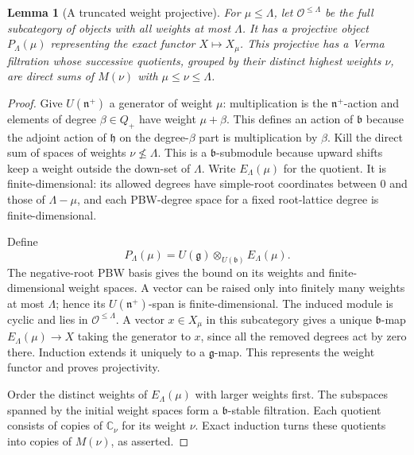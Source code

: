 \documentclass[11pt,oneside,openany]{book}
\newtheorem{lemma}[theorem]{Lemma}
\theoremstyle{definition}
\theoremstyle{remark}
\begin{document}
\begin{lemma}[A truncated weight projective]
\label{res:LO04}
For \(\mu\le\Lambda\), let \(\mathcal O^{\le\Lambda}\) be the
full subcategory of objects with all weights at most \(\Lambda\).
It has a projective object \(P_\Lambda(\mu)\) representing the
exact functor \(X\mapsto X_\mu\). This projective has a Verma
filtration whose successive quotients, grouped by their distinct
highest weights \(\nu\), are direct sums of \(M(\nu)\) with
\(\mu\le\nu\le\Lambda\).
\end{lemma}
\begin{proof}
Give \(U(\mathfrak n^+)\) a generator of weight \(\mu\): multiplication
is the \(\mathfrak n^+\)-action and elements of degree \(\beta\in Q_+\)
have weight \(\mu+\beta\). This defines an action of
\(\mathfrak b\) because the adjoint action of \(\mathfrak h\) on
the degree-\(\beta\) part is multiplication by \(\beta\).
Kill the direct sum of spaces of weights \(\nu\not\le\Lambda\).
This is a \(\mathfrak b\)-submodule because upward shifts keep a
weight outside the down-set of \(\Lambda\). Write \(E_\Lambda(\mu)\)
for the quotient. It is finite-dimensional: its allowed degrees
have simple-root coordinates between \(0\) and those of
\(\Lambda-\mu\), and each PBW-degree space for a fixed root-lattice
degree is finite-dimensional.

Define
\[
  P_\Lambda(\mu)=U(\mathfrak g)\otimes_{U(\mathfrak b)}E_\Lambda(\mu).
\]
The negative-root PBW basis gives the bound on its weights and
finite-dimensional weight spaces. A vector can be raised only
into finitely many weights at most \(\Lambda\); hence its
\(U(\mathfrak n^+)\)-span is finite-dimensional. The induced
module is cyclic and lies in \(\mathcal O^{\le\Lambda}\).
A vector \(x\in X_\mu\) in this subcategory gives a unique
\(\mathfrak b\)-map \(E_\Lambda(\mu)\to X\) taking the generator
to \(x\), since all the removed degrees act by zero there.
Induction extends it uniquely to a \(\mathfrak g\)-map. This
represents the weight functor and proves projectivity.

Order the distinct weights of \(E_\Lambda(\mu)\) with larger weights
first. The subspaces spanned by the initial weight spaces form
a \(\mathfrak b\)-stable filtration. Each quotient consists of
copies of \(\mathbb C_\nu\) for its weight \(\nu\). Exact induction
turns these quotients into copies of \(M(\nu)\), as asserted.
\end{proof}
\end{document}
